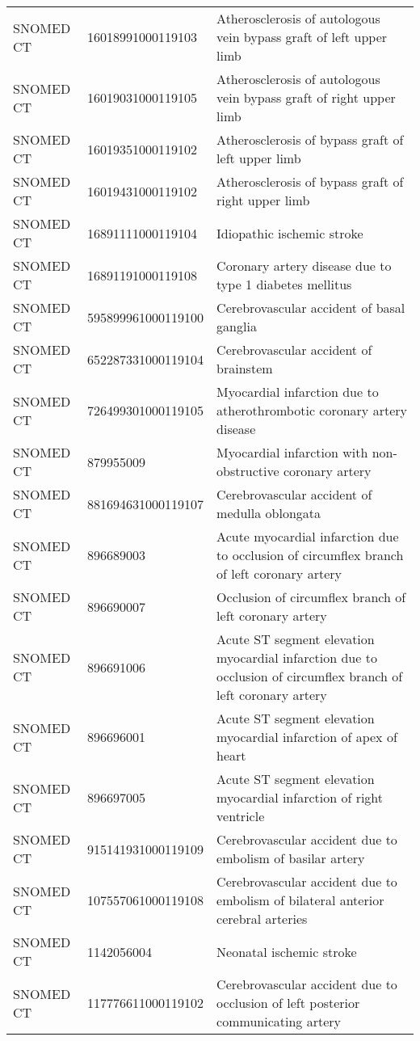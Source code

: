 \begin{longtable}{p{}p{}p{}}
  SNOMED CT & 16018991000119103 & Atherosclerosis of autologous vein bypass graft of left upper limb \\ 
  SNOMED CT & 16019031000119105 & Atherosclerosis of autologous vein bypass graft of right upper limb \\ 
  SNOMED CT & 16019351000119102 & Atherosclerosis of bypass graft of left upper limb \\ 
  SNOMED CT & 16019431000119102 & Atherosclerosis of bypass graft of right upper limb \\ 
  SNOMED CT & 16891111000119104 & Idiopathic ischemic stroke \\ 
  SNOMED CT & 16891191000119108 & Coronary artery disease due to type 1 diabetes mellitus \\ 
  SNOMED CT & 595899961000119100 & Cerebrovascular accident of basal ganglia \\ 
  SNOMED CT & 652287331000119104 & Cerebrovascular accident of brainstem \\ 
  SNOMED CT & 726499301000119105 & Myocardial infarction due to atherothrombotic coronary artery disease \\ 
  SNOMED CT & 879955009 & Myocardial infarction with non-obstructive coronary artery \\ 
  SNOMED CT & 881694631000119107 & Cerebrovascular accident of medulla oblongata \\ 
  SNOMED CT & 896689003 & Acute myocardial infarction due to occlusion of circumflex branch of left coronary artery \\ 
  SNOMED CT & 896690007 & Occlusion of circumflex branch of left coronary artery \\ 
  SNOMED CT & 896691006 & Acute ST segment elevation myocardial infarction due to occlusion of circumflex branch of left coronary artery \\ 
  SNOMED CT & 896696001 & Acute ST segment elevation myocardial infarction of apex of heart \\ 
  SNOMED CT & 896697005 & Acute ST segment elevation myocardial infarction of right ventricle \\ 
  SNOMED CT & 915141931000119109 & Cerebrovascular accident due to embolism of basilar artery \\ 
  SNOMED CT & 107557061000119108 & Cerebrovascular accident due to embolism of bilateral anterior cerebral arteries \\ 
  SNOMED CT & 1142056004 & Neonatal ischemic stroke \\ 
  SNOMED CT & 117776611000119102 & Cerebrovascular accident due to occlusion of left posterior communicating artery \\ 

\end{longtable}
